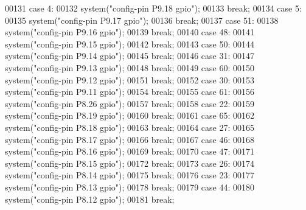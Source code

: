 \begin{DoxyCode}
00131   \textcolor{keywordflow}{case} 4:
00132     system(\textcolor{stringliteral}{"config-pin P9.18 gpio"});
00133     \textcolor{keywordflow}{break};
00134   \textcolor{keywordflow}{case} 5:
00135     system(\textcolor{stringliteral}{"config-pin P9.17 gpio"});
00136     \textcolor{keywordflow}{break};
00137   \textcolor{keywordflow}{case} 51:
00138     system(\textcolor{stringliteral}{"config-pin P9.16 gpio"});
00139     \textcolor{keywordflow}{break};
00140   \textcolor{keywordflow}{case} 48:
00141     system(\textcolor{stringliteral}{"config-pin P9.15 gpio"});
00142     \textcolor{keywordflow}{break};
00143   \textcolor{keywordflow}{case} 50:
00144     system(\textcolor{stringliteral}{"config-pin P9.14 gpio"});
00145     \textcolor{keywordflow}{break};
00146   \textcolor{keywordflow}{case} 31:
00147     system(\textcolor{stringliteral}{"config-pin P9.13 gpio"});
00148     \textcolor{keywordflow}{break};
00149   \textcolor{keywordflow}{case} 60:
00150     system(\textcolor{stringliteral}{"config-pin P9.12 gpio"});
00151     \textcolor{keywordflow}{break};
00152   \textcolor{keywordflow}{case} 30:
00153     system(\textcolor{stringliteral}{"config-pin P9.11 gpio"});
00154     \textcolor{keywordflow}{break};
00155   \textcolor{keywordflow}{case} 61:
00156     system(\textcolor{stringliteral}{"config-pin P8.26 gpio"});
00157     \textcolor{keywordflow}{break};
00158   \textcolor{keywordflow}{case} 22:
00159     system(\textcolor{stringliteral}{"config-pin P8.19 gpio"});
00160     \textcolor{keywordflow}{break};
00161   \textcolor{keywordflow}{case} 65:
00162     system(\textcolor{stringliteral}{"config-pin P8.18 gpio"});
00163     \textcolor{keywordflow}{break};
00164   \textcolor{keywordflow}{case} 27:
00165     system(\textcolor{stringliteral}{"config-pin P8.17 gpio"});
00166     \textcolor{keywordflow}{break};
00167   \textcolor{keywordflow}{case} 46:
00168     system(\textcolor{stringliteral}{"config-pin P8.16 gpio"});
00169     \textcolor{keywordflow}{break};
00170   \textcolor{keywordflow}{case} 47:
00171     system(\textcolor{stringliteral}{"config-pin P8.15 gpio"});
00172     \textcolor{keywordflow}{break};
00173   \textcolor{keywordflow}{case} 26:
00174     system(\textcolor{stringliteral}{"config-pin P8.14 gpio"});
00175     \textcolor{keywordflow}{break};
00176   \textcolor{keywordflow}{case} 23:
00177     system(\textcolor{stringliteral}{"config-pin P8.13 gpio"});
00178     \textcolor{keywordflow}{break};
00179   \textcolor{keywordflow}{case} 44:
00180     system(\textcolor{stringliteral}{"config-pin P8.12 gpio"});
00181     \textcolor{keywordflow}{break};

\end{DoxyCode}
